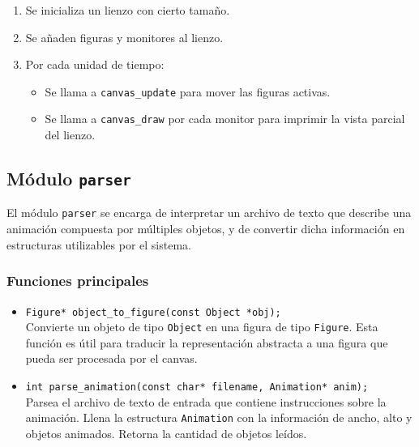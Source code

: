 \documentclass[12pt]{article}
\begin{document}
\begin{enumerate}
    \item Se inicializa un lienzo con cierto tamaño.
    \item Se añaden figuras y monitores al lienzo.
    \item Por cada unidad de tiempo:
    \begin{itemize}
        \item Se llama a \texttt{canvas\_update} para mover las figuras activas.
        \item Se llama a \texttt{canvas\_draw} por cada monitor para imprimir la vista parcial del lienzo.
    \end{itemize}
\end{enumerate}

\subsection{Módulo \texttt{parser}}

El módulo \texttt{parser} se encarga de interpretar un archivo de texto que describe una animación compuesta por múltiples objetos, y de convertir dicha información en estructuras utilizables por el sistema.



\subsubsection*{Funciones principales}

\begin{itemize}
    \item \texttt{Figure* object\_to\_figure(const Object *obj);} \\
    Convierte un objeto de tipo \texttt{Object} en una figura de tipo \texttt{Figure}. Esta función es útil para traducir la representación abstracta a una figura que pueda ser procesada por el canvas.

    \item \texttt{int parse\_animation(const char* filename, Animation* anim);} \\
    Parsea el archivo de texto de entrada que contiene instrucciones sobre la animación. Llena la estructura \texttt{Animation} con la información de ancho, alto y objetos animados. Retorna la cantidad de objetos leídos.
\end{itemize}
\end{document}
